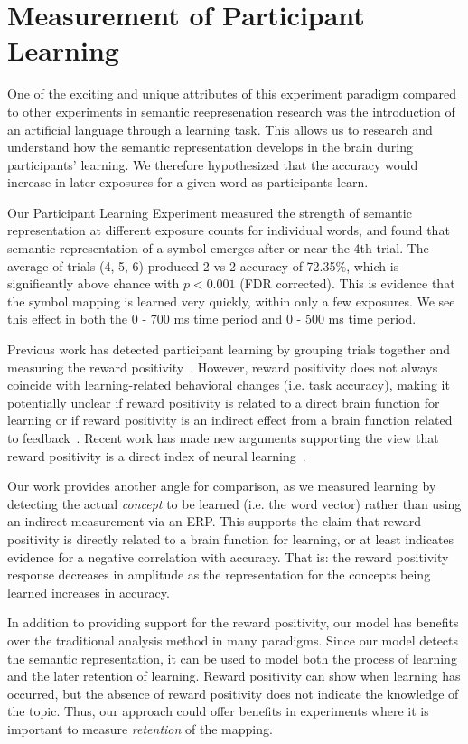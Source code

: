 \section{Measurement of Participant Learning}
One of the exciting and unique attributes of this experiment paradigm compared 
to other experiments in semantic reepresenation research was the introduction 
of an artificial language through a learning task. This allows us to research 
and understand how the semantic representation develops in the brain during 
participants' learning. We therefore hypothesized that the \tvt accuracy would 
increase in later exposures for a given word as participants learn.

Our Participant Learning Experiment measured the strength of semantic 
representation at different exposure counts for individual words, and found 
that semantic representation of a symbol emerges after or near the 4th trial.  
The average of trials (4, 5, 6) produced 2 vs 2 accuracy of 72.35\%, which is 
significantly above chance with $p < 0.001$ (FDR corrected). This is evidence 
that the symbol mapping is learned very quickly, within only a few exposures.  
We see this effect in both the 0 - 700 ms time period and 0 - 500 ms time 
period.

Previous work has detected participant learning by grouping trials together and 
measuring the reward positivity~\cite{krigolson2014we}. However, reward 
positivity does not always coincide with learning-related behavioral changes 
(i.e. task accuracy), making it potentially unclear if reward positivity is 
related to a direct brain function for learning or if reward positivity is an 
indirect effect from a brain function related to 
feedback~\cite{walsh2012learning}. Recent work has made new arguments 
supporting the view that reward positivity is a direct index of neural 
learning~\cite{williams2017application}. 

Our work provides another angle for comparison, as we measured learning by 
detecting the actual \emph{concept} to be learned (i.e. the word vector) rather 
than using an indirect measurement via an ERP. This supports the claim that 
reward positivity is directly related to a brain function for learning, or at 
least indicates evidence for a negative correlation with \tvt accuracy. That 
is: the reward positivity response decreases in amplitude as the representation 
for the concepts being learned increases in \tvt accuracy.

In addition to providing support for the reward positivity, our model has 
benefits over the traditional analysis method in many paradigms. Since our 
model detects the semantic representation, it can be used to model both the 
process of learning and the later retention of learning.  Reward positivity can 
show when learning has occurred, but the absence of reward positivity does not 
indicate the knowledge of the topic.  Thus, our approach could offer benefits 
in experiments where it is important to measure \emph{retention} of the 
mapping.

